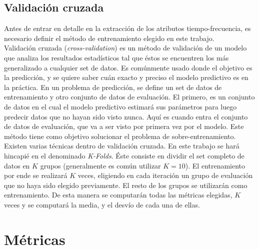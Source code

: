 \subsection*{Validación cruzada} \label{subsec:cross-validation}

\indent Antes de entrar en detalle en la extracción de los atributos tiempo-frecuencia, es necesario definir el
método de entrenamiento elegido en este trabajo. \\
\indent Validación cruzada (\textit{cross-validation}) es un método de validación de un modelo que analiza los
resultados estadísticos tal que éstos se encuentren los más generalizado a cualquier set de datos.
Es comúnmente usado donde el objetivo es la predicción, y se quiere saber cuán exacto y preciso el modelo predictivo
es en la práctica.
En un problema de predicción, se define un set de datos de entrenamiento y otro conjunto de datos de
evaluación. El primero, es un conjunto de datos en el cual el modelo predictivo estimará sus parámetros para luego
predecir datos que no hayan sido visto nunca.
Aquí es cuando entra el conjunto de datos de evaluación, que va a ser visto por primera vez por el modelo. Este
método tiene como objetivo solucionar el problema de sobre-entrenamiento. \\
\indent Existen varias técnicas dentro de validación cruzada. En este trabajo se hará hincapié en el denominado
\textit{K-Folds}.
Éste consiste en dividir el set completo de datos en $K$ grupos (generalmente es común utilizar $K = 10$).
El entrenamiento por ende se realizará $K$ veces, eligiendo en cada iteración un grupo de evaluación que no haya sido
elegido previamente. El resto de los grupos se utilizarán como entrenamiento.
De esta manera se computarán todas las métricas elegidas, $K$ veces y se computará la media, y el desvío de cada una
de ellas.

\section{Métricas} \label{sec:metrics}

